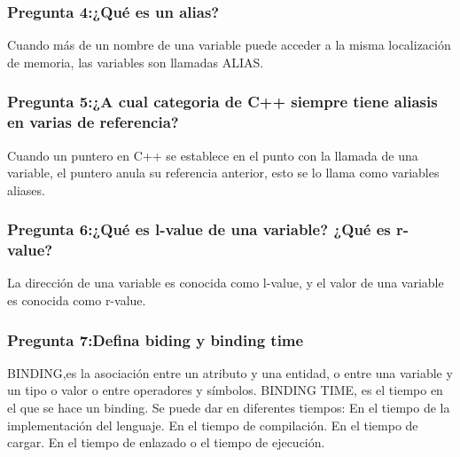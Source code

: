 \subsubsection{Pregunta 4:¿Qué es un alias?}
Cuando más de un nombre de una variable puede acceder a la misma  localización de memoria, las variables son llamadas ALIAS.
\subsubsection{Pregunta 5:¿A cual categoria de C++ siempre tiene aliasis en varias de referencia?}
Cuando un puntero en C++ se establece en el punto con la llamada de una variable, el puntero anula su referencia anterior,  esto se lo llama como variables aliases.
\subsubsection{Pregunta 6:¿Qué es l-value de una variable? ¿Qué es r-value?}
La dirección de una variable es conocida como l-value, y el valor de una variable es conocida como r-value.
\subsubsection{Pregunta 7:Defina biding y binding time}
BINDING,es la asociación entre un atributo y una entidad, o entre una variable y un tipo o valor o entre operadores y símbolos.
BINDING TIME, es el tiempo en el que se hace un binding.
Se puede dar en diferentes tiempos:
En el tiempo de la implementación del lenguaje.
En el tiempo de compilación.
En el tiempo de cargar.
En el tiempo de enlazado o el tiempo de ejecución.


